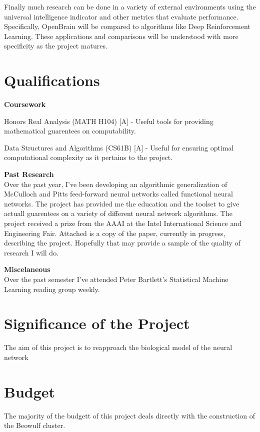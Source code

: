 \documentclass[letter]{article}
\newenvironment{menumerate}{%
  \edef\backupindent{\the\parindent}%
  \enumerate%
  \setlength{\parindent}{\backupindent}%
}{\endenumerate}
\begin{document}
Finally much research can be done in a variety of external environments using the universal intelligence indicator
and other metrics that evaluate performance. Specifically, OpenBrain will be compared to algorithms like Deep Reinforcement Learning. 
These applications and comparisons will be understood with more specificity as the project matures.

\section{Qualifications}
\textbf{Coursework}
\begin{menumerate}
\item Honors Real Analysis (MATH H104) [A] - Useful tools for providing mathematical guarentees on computability.
\item Data Structures and Algorithms (CS61B) [A] - Useful for ensuring optimal computational complexity as it pertains to the project.
\end{menumerate}


\textbf{Past Research} \\
Over the past year, I've been developing an algorithmic generalization of McCulloch and Pitts feed-forward neural networks
called functional neural networks. The project has provided me the education and the toolset to give actuall guarentees on
a variety of different neural network algorithms. The project received a prize from the AAAI at the Intel International Science and Engineering Fair.
Attached is a copy of the paper, currently in progress, describing the project. Hopefully that may provide a sample of the quality
of research I will do.

\textbf{Miscelaneous} \\
Over the past semester I've attended Peter Bartlett's Statistical Machine Learning reading group weekly.

\section{Significance of the Project}
The aim of this project is to reapproach the biological model of the neural network

\section{Budget}
The majority of the budgett of this project deals directly with the construction of the Beowulf cluster.
\end{document}
